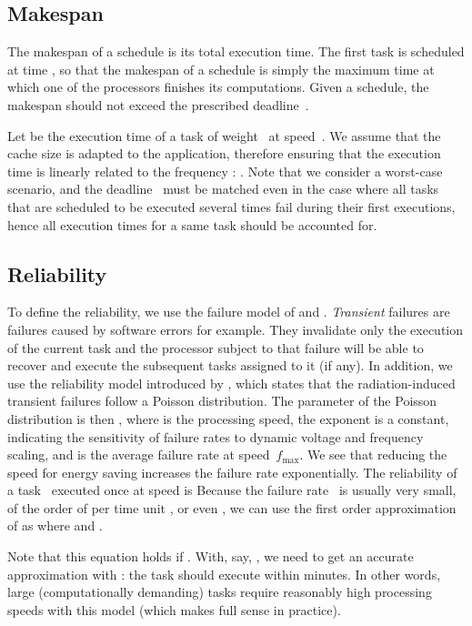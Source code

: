 \documentclass[a4paper]{article}
\theoremstyle{plain}
\theoremstyle{definition}
\theoremstyle{remark}
\newcommand{\fmax}{\ensuremath{f_{\max}}\xspace}
\begin{document}
\subsection{Makespan}

The makespan of a schedule is its total execution time. The first task
is scheduled at time , so that the make\-span of a schedule is simply
the maximum time at which one of the processors finishes its
computations.  Given a schedule, the makespan should not exceed the
prescribed deadline~. 

Let  be the execution time of a task  of
weight~ at speed~. We assume that the cache size is adapted to
the application, therefore ensuring that the execution time is
linearly related to the frequency \cite{Melhem03CP}: . Note that we consider a worst-case scenario, and the
deadline~ must be matched even in the case where all tasks that are
scheduled to be executed several times fail during their first
executions, hence all execution times for a same task should be
accounted for.



\subsection{Reliability}
    \label{sec.rel}
To define the reliability, we use the failure model of
\cite{Zhu04EEM} and \cite{Zhu06}. 
\emph{Transient} failures are failures caused by software errors for example. 
They invalidate only the execution of
the current task and the processor subject to that failure will be
able to recover and execute the subsequent tasks assigned to it (if
any). In addition, we use the reliability model introduced by \cite{Shatz89}, 
which states that the radiation-induced
transient failures follow a Poisson distribution.  The parameter
 of the Poisson distribution is then ,
where  is the processing speed, the exponent
 is a constant, indicating the sensitivity of failure
rates to dynamic voltage and frequency scaling, and
 is the average failure rate at speed~\fmax.  We
see that reducing the speed for energy saving increases the failure
rate exponentially.  The reliability of a task~ executed once at
speed  is   Because the
failure rate~ is usually very small, of the order of
 per time unit \cite{Assayad11}, or even 
\cite{Baleani03,Izo07}, we can use the first order approximation of
 as 
where  and . 

\medskip
Note that this equation holds if \mbox{}.  With, say, , we need
 to get an accurate approximation with
: the task should execute within 
minutes. In other words, large (computationally demanding) tasks
require reasonably high processing speeds with this model (which makes
full sense in practice).
\end{document}
